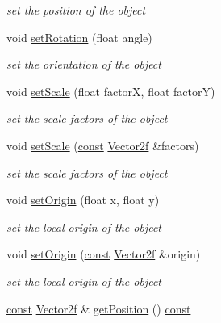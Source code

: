 \begin{DoxyCompactItemize}
\begin{DoxyCompactList}\small\item\em set the position of the object \end{DoxyCompactList}\item 
void \hyperlink{classsf_1_1_transformable_a32baf2bf1a74699b03bf8c95030a38ed}{set\-Rotation} (float angle)
\begin{DoxyCompactList}\small\item\em set the orientation of the object \end{DoxyCompactList}\item 
void \hyperlink{classsf_1_1_transformable_aaec50b46b3f41b054763304d1e727471}{set\-Scale} (float factor\-X, float factor\-Y)
\begin{DoxyCompactList}\small\item\em set the scale factors of the object \end{DoxyCompactList}\item 
void \hyperlink{classsf_1_1_transformable_a4c48a87f1626047e448f9c1a68ff167e}{set\-Scale} (\hyperlink{term__entry_8h_a57bd63ce7f9a353488880e3de6692d5a}{const} \hyperlink{namespacesf_a80cea3c46537294fd1d8d428566ad8b2}{Vector2f} \&factors)
\begin{DoxyCompactList}\small\item\em set the scale factors of the object \end{DoxyCompactList}\item 
void \hyperlink{classsf_1_1_transformable_a56c67bd80aae8418d13fb96c034d25ec}{set\-Origin} (float x, float y)
\begin{DoxyCompactList}\small\item\em set the local origin of the object \end{DoxyCompactList}\item 
void \hyperlink{classsf_1_1_transformable_aa93a835ffbf3bee2098dfbbc695a7f05}{set\-Origin} (\hyperlink{term__entry_8h_a57bd63ce7f9a353488880e3de6692d5a}{const} \hyperlink{namespacesf_a80cea3c46537294fd1d8d428566ad8b2}{Vector2f} \&origin)
\begin{DoxyCompactList}\small\item\em set the local origin of the object \end{DoxyCompactList}\item 
\hyperlink{term__entry_8h_a57bd63ce7f9a353488880e3de6692d5a}{const} \hyperlink{namespacesf_a80cea3c46537294fd1d8d428566ad8b2}{Vector2f} \& \hyperlink{classsf_1_1_transformable_a6a0552d8cf155b7df25f6ceda8ee45a5}{get\-Position} () \hyperlink{term__entry_8h_a57bd63ce7f9a353488880e3de6692d5a}{const} 

\end{DoxyCompactItemize}
